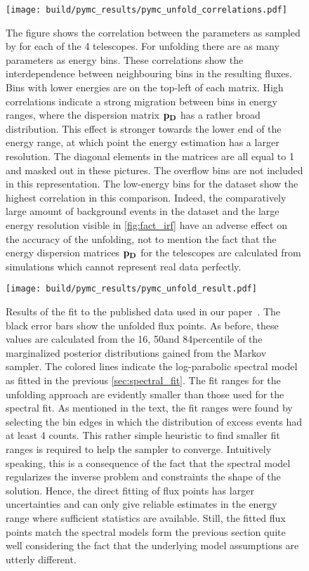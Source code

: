 \begin{figure}
  \centering
  \texttt{[image: build/pymc\_results/pymc\_unfold\_correlations.pdf]}
  \caption[Correlation between unfolded flux points.]{The figure shows the correlation between the parameters as sampled by \pymc for each of the 4 telescopes. For unfolding there are as many 
  parameters as energy bins. These correlations show the interdependence between neighbouring bins 
  in the resulting fluxes. Bins with lower energies are on the top-left of each matrix. High correlations indicate a strong migration between 
  bins in energy ranges, where the dispersion matrix $\mathbf{p_D}$ has a
  rather broad distribution. This effect is stronger towards the lower end of the energy range, at which point the energy estimation has a larger resolution. 
  The diagonal elements in the matrices are all equal to 1 and masked out in these pictures. The overflow bins are not included in this representation.
  The low-energy bins for the \fact dataset show the highest correlation in this comparison. Indeed, the comparatively large amount of background 
  events in the dataset and the large energy resolution visible in \cref{fig:fact_irf} have an adverse effect on the accuracy of the unfolding, 
  not to mention the fact that the energy dispersion matrices $\mathbf{p_D}$ for the telescopes are calculated from simulations which cannot represent 
  real data perfectly.
  }
  \label{fig:bin_correlations}
\end{figure}


\begin{figure}
  \centering
  \texttt{[image: build/pymc\_results/pymc\_unfold\_result.pdf]}
  \caption[Results of the \pymc unfolding]{Results of the \pymc fit to the published data used in our paper~\cite{joint_crab}. 
  The black error bars show the unfolded flux points. As before, these 
  values are calculated from the 16\th, 50\th and 84\th percentile of the marginalized posterior distributions gained from the Markov sampler.
  The colored lines indicate the log-parabolic spectral model
  as fitted in the previous \cref{sec:spectral_fit}.
  The fit ranges for the unfolding approach are evidently smaller than those used for the spectral fit.
  As mentioned in the text, the fit ranges were found by selecting the bin edges in which the distribution of excess events
  had at least 4 counts. This rather simple heuristic to find smaller fit ranges is required to help the \pymc sampler to converge.
  Intuitively speaking, this is a consequence of the fact that the spectral model regularizes the inverse problem 
  and constraints the shape of the solution. Hence, the direct fitting of flux points has larger uncertainties and can only give reliable 
  estimates in the energy range where sufficient statistics are available.
  Still, the fitted flux points match the spectral models form the previous section quite well considering the fact that the underlying model assumptions 
  are utterly different.
  }
  \label{fig:unfolding_results}
\end{figure}

